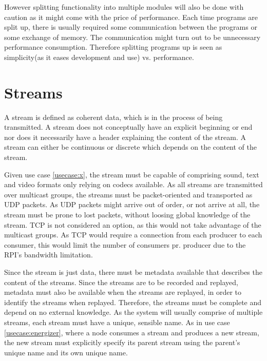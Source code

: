 However splitting functionality into multiple modules will also be done with caution as it might come with the price of performance. Each time programs are split up, there is usually required some communication between the programs or some exchange of memory. The communication might turn out to be unnecessary performance consumption. Therefore splitting programs up is seen as simplicity(as it eases development and use) vs. performance.


\section{Streams}
A stream is defined as coherent data, which is in the process of being transmitted. A stream does not conceptually have an explicit beginning or end nor does it necessarily have a header explaining the content of the stream. A stream can either be continuous or discrete which depends on the content of the stream. 

Given use case \ref{usecase:x}, the stream must be capable of comprising sound, text and video formats only relying on codecs available. As all streams are transmitted over multicast groups, the streams must be packet-oriented and transported as UDP packets. As UDP packets might arrive out of order, or not arrive at all, the stream must be prone to lost packets, without loosing global knowledge of the stream. TCP is not considered an option, as this would not take  advantage of the multicast groups. As TCP would require a connection from each producer to each consumer, this would limit the number of consumers pr. producer due to the RPI's bandwidth limitation.

Since the stream is just data, there must be metadata available that describes the content of the streams. Since the streams are to be recorded and replayed, metadata must also be available when the streams are replayed, in order to identify the streams when replayed. Therefore, the streams must be complete and depend on no external knowledge.
As the system will usually comprise of multiple streams, each stream must have a unique, sensible name.
As in use case \ref{usecase:energizer}, where a node consumes a stream and produces a new stream, the new stream must explicitly specify its parent stream using the parent's unique name and its own unique name.


